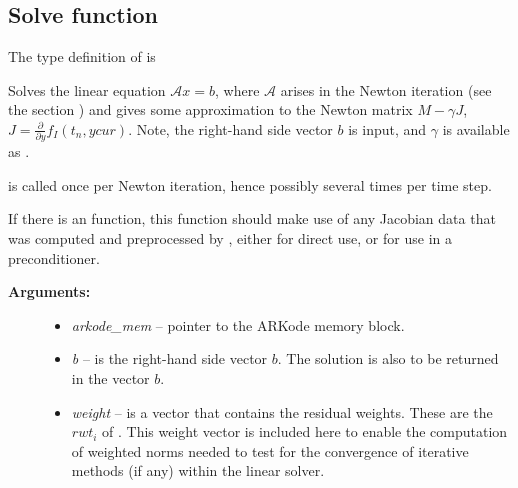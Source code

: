 \documentclass[letterpaper,10pt,english]{sphinxmanual}
\begin{document}
\subsection{Solve function}
\label{linear_solvers/custom:solve-function}
The type definition of {\hyperref[linear_solvers/custom:c.lsolve]{\emph{}}} is

\begin{fulllineitems}
\label{linear_solvers/custom:c.lsolve}
Solves the linear equation \({\mathcal A} x = b\), where
\({\mathcal A}\) arises  in the Newton iteration (see the
section {\hyperref[Mathematics:mathematics-linear]{\emph{}}}) and gives some approximation to
the Newton matrix \(M - \gamma J\), \(J =
\frac{\partial}{\partial y} f_I(t_n, ycur)\). Note, the right-hand
side vector  \(b\) is input, and \(\gamma\) is available as
.

{\hyperref[linear_solvers/custom:c.lsolve]{\emph{}}} is called once per Newton iteration, hence possibly
several times per time step.

If there is an {\hyperref[linear_solvers/custom:c.lsetup]{\emph{}}} function, this {\hyperref[linear_solvers/custom:c.lsolve]{\emph{}}}
function should make use of any Jacobian data that was computed and
preprocessed by {\hyperref[linear_solvers/custom:c.lsetup]{\emph{}}}, either for direct use, or for
use in a preconditioner.
\begin{description}
\item[{\textbf{Arguments:}}] \leavevmode\begin{itemize}
\item {} 
\emph{arkode\_mem} -- pointer to the ARKode memory block.

\item {} 
\emph{b} -- is the right-hand side vector \(b\). The solution
is also to be returned in the vector \(b\).

\item {} 
\emph{weight} -- is a vector that contains the residual weights. These
are the \(rwt_i\) of {\hyperref[c_interface/User_supplied:cinterface-residualweight]{\emph{}}}.
This weight vector is included here to enable the computation
of weighted norms needed to test for the convergence of
iterative methods (if any) within the linear solver.


\end{itemize}
\end{description}
\end{fulllineitems}
\end{document}

